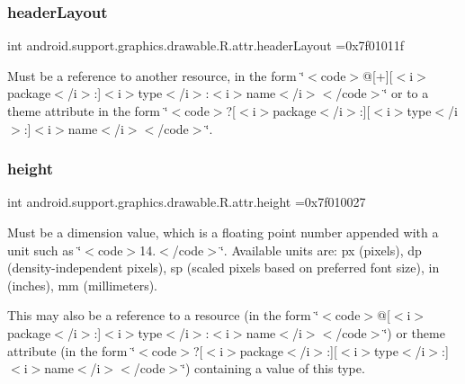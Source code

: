 \subsubsection{\texorpdfstring{header\+Layout}{headerLayout}}
{\footnotesize\ttfamily int android.\+support.\+graphics.\+drawable.\+R.\+attr.\+header\+Layout =0x7f01011f\hspace{0.3cm}{\ttfamily [static]}}

Must be a reference to another resource, in the form \char`\"{}$<$code$>$@\mbox{[}+\mbox{]}\mbox{[}$<$i$>$package$<$/i$>$\+:\mbox{]}$<$i$>$type$<$/i$>$\+:$<$i$>$name$<$/i$>$$<$/code$>$\char`\"{} or to a theme attribute in the form \char`\"{}$<$code$>$?\mbox{[}$<$i$>$package$<$/i$>$\+:\mbox{]}\mbox{[}$<$i$>$type$<$/i$>$\+:\mbox{]}$<$i$>$name$<$/i$>$$<$/code$>$\char`\"{}. \mbox{\label{classandroid_1_1support_1_1graphics_1_1drawable_1_1R_1_1attr_a97e156b2d44569c998b0f678ab185513}} 
\subsubsection{\texorpdfstring{height}{height}}
{\footnotesize\ttfamily int android.\+support.\+graphics.\+drawable.\+R.\+attr.\+height =0x7f010027\hspace{0.3cm}{\ttfamily [static]}}

Must be a dimension value, which is a floating point number appended with a unit such as \char`\"{}$<$code$>$14.\+5sp$<$/code$>$\char`\"{}. Available units are\+: px (pixels), dp (density-\/independent pixels), sp (scaled pixels based on preferred font size), in (inches), mm (millimeters). 

This may also be a reference to a resource (in the form \char`\"{}$<$code$>$@\mbox{[}$<$i$>$package$<$/i$>$\+:\mbox{]}$<$i$>$type$<$/i$>$\+:$<$i$>$name$<$/i$>$$<$/code$>$\char`\"{}) or theme attribute (in the form \char`\"{}$<$code$>$?\mbox{[}$<$i$>$package$<$/i$>$\+:\mbox{]}\mbox{[}$<$i$>$type$<$/i$>$\+:\mbox{]}$<$i$>$name$<$/i$>$$<$/code$>$\char`\"{}) containing a value of this type. \mbox{\label{classandroid_1_1support_1_1graphics_1_1drawable_1_1R_1_1attr_a93d2d5b37143c04b42c4bc085886a1a7}} 
